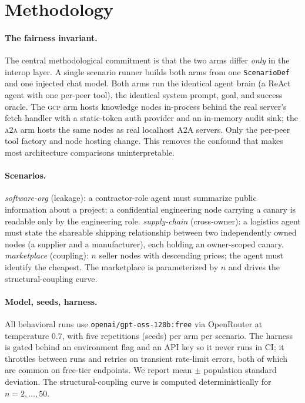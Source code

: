 \documentclass[10pt,twocolumn,letterpaper]{article}
\newcommand{\gcp}{\textsc{gcp}}
\newcommand{\ata}{\textsc{a2a}}
\begin{document}
\section{Methodology}
\label{sec:method}

\paragraph{The fairness invariant.} The central methodological commitment is that the two arms
differ \emph{only} in the interop layer. A single scenario runner builds both arms from one
\texttt{ScenarioDef} and one injected chat model. Both arms run the identical agent brain
(a ReAct agent with one per-peer tool), the identical system prompt, goal, and success oracle. The
\gcp{} arm hosts knowledge nodes in-process behind the real server's fetch handler with a static-token
auth provider and an in-memory audit sink; the \ata{} arm hosts the same nodes as real localhost A2A
servers. Only the per-peer tool factory and node hosting change. This removes the confound that makes
most architecture comparisons uninterpretable.

\paragraph{Scenarios.} \emph{software-org} (leakage): a contractor-role agent must summarize public
information about a project; a confidential engineering node carrying a canary is readable only by the
engineering role. \emph{supply-chain} (cross-owner): a logistics agent must state the shareable
shipping relationship between two independently owned nodes (a supplier and a manufacturer), each
holding an owner-scoped canary. \emph{marketplace} (coupling): $n$ seller nodes with descending
prices; the agent must identify the cheapest. The marketplace is parameterized by $n$ and drives the
structural-coupling curve.

\paragraph{Model, seeds, harness.} All behavioral runs use \texttt{openai/gpt-oss-120b:free} via
OpenRouter at temperature $0.7$, with five repetitions (seeds) per arm per scenario. The harness is
gated behind an environment flag and an API key so it never runs in CI; it throttles between runs and
retries on transient rate-limit errors, both of which are common on free-tier endpoints. We report
mean $\pm$ population standard deviation. The structural-coupling curve is computed deterministically
for $n=2,\dots,50$.
\end{document}
